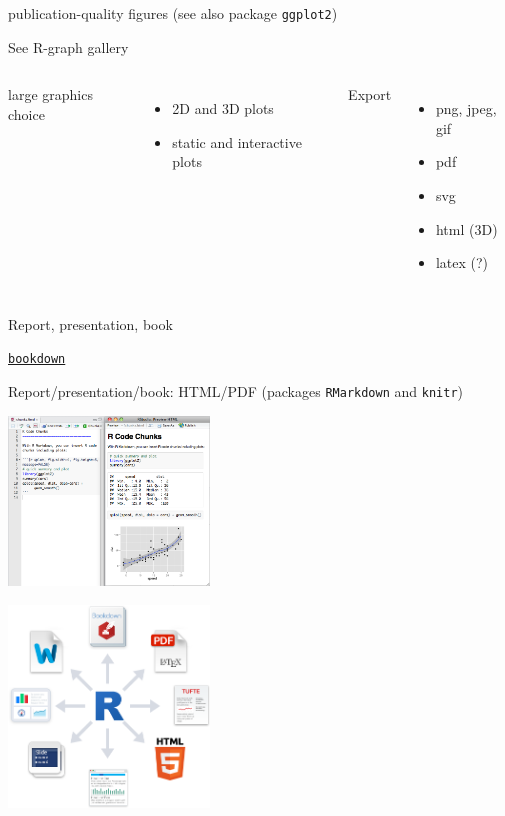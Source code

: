 \documentclass[8pt,ignorenonframetext,]{beamer}
\providecommand{\tightlist}{%
  \setlength{\itemsep}{0pt}\setlength{\parskip}{0pt}}
\newcommand{\columnsbegin}{\begin{columns}}
\newcommand{\columnsend}{\end{columns}}
\begin{document}
\begin{frame}{publication-quality figures (see also package
\texttt{ggplot2})}

See R-graph gallery

\columnsbegin
{}

large graphics choice

\begin{itemize}
\tightlist
\item
  2D and 3D plots
\item
  static and interactive plots
\end{itemize}


Export

\begin{itemize}
\tightlist
\item
  png, jpeg, gif
\item
  pdf
\item
  svg
\item
  html (3D)
\item
  latex (?)
\end{itemize}

\columnsend

\end{frame}

\begin{frame}[fragile]{Report, presentation, book}

\href{https://cran.r-project.org/web/packages/bookdown/index.html}{\texttt{bookdown}}

Report/presentation/book: HTML/PDF (packages \texttt{RMarkdown} and
\texttt{knitr})

\includegraphics[width=0.40000\textwidth]{imgPres/report_markdownchunk.png}

\includegraphics[width=0.40000\textwidth]{imgPres/report_rmarkdownoutputformats.png}

\end{frame}
\end{document}
